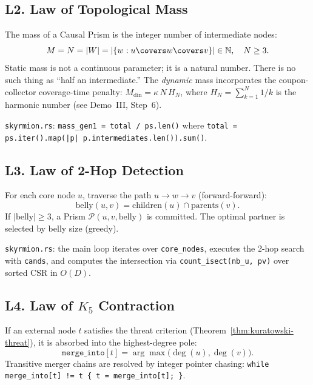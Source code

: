 \subsection*{L2. Law of Topological Mass}
\label{law:topological-mass}

The mass of a Causal Prism is the integer number of intermediate
nodes:
\begin{equation}
  M = N = |W| = |\{w : u \covers w \covers v\}|
  \in \mathbb{N},\quad N \geq 3.
  \label{eq:law-mass}
\end{equation}
Static mass is not a continuous parameter; it is a natural number.
There is no such thing as ``half an intermediate.''
The \emph{dynamic} mass incorporates the coupon-collector coverage-time
penalty: $M_{\mathrm{din}} = \kappa\,N\,H_N$, where
$H_N = \sum_{k=1}^{N} 1/k$ is the harmonic number
(see Demo~III, Step~6).

\medskip\noindent
\texttt{skyrmion.rs}: \texttt{mass\_gen1 = total / ps.len()}
where \texttt{total = ps.iter().map(|p|
p.intermediates.len()).sum()}.

\subsection*{L3. Law of 2-Hop Detection}
\label{law:2hop-detection}

For each core node $u$, traverse the path $u \to w \to v$
(forward-forward):
\[
  \text{belly}(u,v) = \text{children}(u) \cap \text{parents}(v).
\]
If $|\text{belly}| \geq 3$, a Prism
$\mathcal{P}(u, v, \text{belly})$ is committed. The optimal
partner is selected by belly size (greedy).

\medskip\noindent
\texttt{skyrmion.rs}: the main loop iterates over
\texttt{core\_nodes}, executes the 2-hop search with
\texttt{cands}, and computes the intersection via
\texttt{count\_isect(nb\_u, pv)} over sorted CSR in $O(D)$.

\subsection*{L4. Law of $K_5$ Contraction}
\label{law:k5-contraction}

If an external node $t$ satisfies the threat criterion
(Theorem~\ref{thm:kuratowski-threat}), it is absorbed into the
highest-degree pole:
\[
  \texttt{merge\_into}[t] = \arg\max\bigl(\deg(u),\deg(v)\bigr).
\]
Transitive merger chains are resolved by
integer pointer chasing:
\texttt{while merge\_into[t] != t \{ t = merge\_into[t]; \}}.

